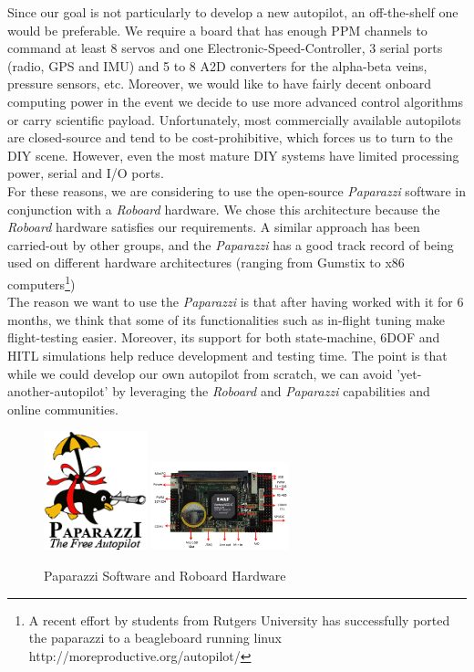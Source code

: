 \documentclass[titlepage,10pt]{article}
\begin{document}
Since our goal is not particularly to develop a new autopilot, an off-the-shelf one would be preferable. We require a board that has enough PPM channels to command at least 8 servos and one Electronic-Speed-Controller, 3 serial ports (radio, GPS and IMU) and 5 to 8 A2D converters for the alpha-beta veins, pressure sensors, etc. Moreover, we would like to have fairly decent onboard computing power in the event we decide to use more advanced control algorithms or carry scientific payload. Unfortunately, most commercially available autopilots are closed-source and tend to be cost-prohibitive, which forces us to turn to the DIY scene. However, even the most mature DIY systems have limited processing power, serial and I/O ports.\\

For these reasons, we are considering to use the open-source \textit{Paparazzi} software in conjunction with a \textit{Roboard} hardware. We chose this architecture because the \textit{Roboard} hardware satisfies our requirements. A similar approach has been carried-out by other groups, and the \textit{Paparazzi} has a good track record of being used on different hardware architectures (ranging from Gumstix to x86 computers\footnote{A recent effort by students from Rutgers University has successfully ported the paparazzi to a beagleboard running linux http://moreproductive.org/autopilot/})\\

The reason we want to use the \textit{Paparazzi} is that after having worked with it for 6 months, we think that some of its functionalities such as in-flight tuning make flight-testing easier. Moreover, its support for both state-machine, 6DOF and HITL simulations help reduce development and testing time. The point is that while we could develop our own autopilot from scratch, we can avoid 'yet-another-autopilot' by leveraging the \textit{Roboard} and \textit{Paparazzi} capabilities and online communities.\\

\begin{figure}[h]
\begin{center}
\includegraphics[width = 30mm] {paparazzi.png}
\includegraphics[width = 40mm] {Roboard.png}
\caption{Paparazzi Software and Roboard Hardware}
\end{center}
\end{figure}
\end{document}
